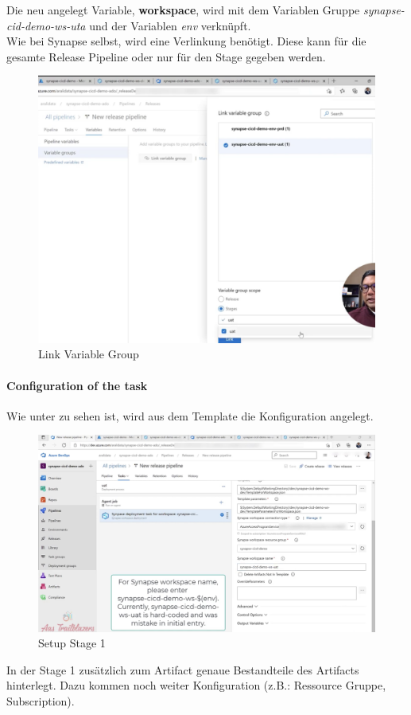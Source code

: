 Die neu angelegt Variable, \textbf{workspace}, wird mit dem Variablen Gruppe \textit{synapse-cid-demo-ws-uta} und der Variablen \textit{env} verknüpft.\\

Wie bei Synapse selbst, wird eine Verlinkung benötigt. Diese kann für die gesamte Release Pipeline oder nur für den Stage gegeben werden.

\begin{figure}[H]
	\centering
	\includegraphics[scale = 0.2]{attachment/chapter_2/Scc160}
	\caption{Link Variable Group}
\end{figure}

\paragraph{Configuration of the task}
Wie unter  zu sehen ist, wird aus dem Template die Konfiguration angelegt.

\begin{figure}[H]
	\centering
	\includegraphics[scale = 0.2]{attachment/chapter_2/Scc161}
	\caption{Setup Stage 1}
\end{figure}
In der Stage 1 zusätzlich zum Artifact genaue Bestandteile des Artifacts hinterlegt. Dazu kommen noch weiter Konfiguration (z.B.: Ressource Gruppe, Subscription).

